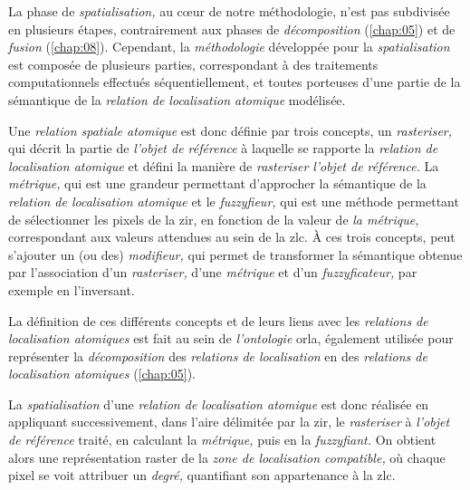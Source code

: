 La phase de \emph{spatialisation,} au cœur de notre méthodologie,
n'est pas subdivisée en plusieurs étapes, contrairement aux phases de
\emph{décomposition} (\autoref{chap:05}) et de \emph{fusion}
(\autoref{chap:08}). Cependant, la \emph{méthodologie} développée pour
la \emph{spatialisation} est composée de plusieurs parties,
correspondant à des traitements computationnels effectués
séquentiellement, et toutes porteuses d'une partie de la sémantique de
la \emph{relation de localisation atomique} modélisée.

Une \emph{relation spatiale atomique} est donc définie par trois
concepts, un \emph{rasteriser,} qui décrit la partie de \emph{l'objet
  de référence} à laquelle se rapporte la \emph{relation de
  localisation atomique} et défini la manière de \emph{rasteriser}
\emph{l'objet de référence.} La \emph{métrique,} qui est une grandeur
permettant d'approcher la sémantique de la \emph{relation de
  localisation atomique} et le \emph{fuzzyfieur,} qui est une méthode
permettant de sélectionner les pixels de la \ac{zir}, en fonction de
la valeur de \emph{la métrique,} correspondant aux valeurs attendues
au sein de la \ac{zlc}. À ces trois concepts, peut s'ajouter un (ou
des) \emph{modifieur,} qui permet de transformer la sémantique obtenue
par l'association d'un \emph{rasteriser,} d'une \emph{métrique} et
d'un \emph{fuzzyficateur,} par exemple en l'inversant.

La définition de ces différents concepts et de leurs liens avec les
\emph{relations de localisation atomiques} est fait au sein de
\emph{l'ontologie} \ac{orla}, également utilisée pour représenter la
\emph{décomposition} des \emph{relations de localisation} en des
\emph{relations de localisation atomiques} (\autoref{chap:05}).

La \emph{spatialisation} d'une \emph{relation de localisation
  atomique} est donc réalisée en appliquant successivement, dans
l'aire délimitée par la \ac{zir}, le \emph{rasteriser} à \emph{l'objet
  de référence} traité, en calculant la \emph{métrique,} puis en la
\emph{fuzzyfiant.} On obtient alors une représentation raster de la
\emph{zone de localisation compatible,} où chaque pixel se voit
attribuer un \emph{degré,} quantifiant son appartenance à la \ac{zlc}.


